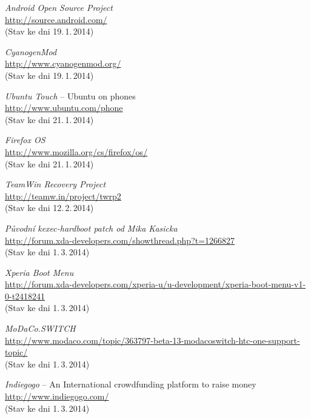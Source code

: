 \documentclass[12pt, a4paper, oneside]{article}
\newcommand{\It}{\textit}  %
\begin{document}
 \begin{thebibliography}{99}

     \It{Android Open Source Project} \\
    \url{http://source.android.com/}\\
    (Stav ke dni 19.\,1.\,2014)

     \It{CyanogenMod} \\
    \url{http://www.cyanogenmod.org/}\\
    (Stav ke dni 19.\,1.\,2014)

     \It{Ubuntu Touch} -- Ubuntu on phones \\
    \url{http://www.ubuntu.com/phone}\\
    (Stav ke dni 21.\,1.\,2014)

     \It{Firefox OS}\\
    \url{http://www.mozilla.org/cs/firefox/os/}\\
    (Stav ke dni 21.\,1.\,2014)

     \It{TeamWin Recovery Project}\\
    \url{http://teamw.in/project/twrp2}\\
    (Stav ke dni 12.\,2.\,2014)

     \It{Původní kexec-hardboot patch od Mika Kasicka}\\
    \url{http://forum.xda-developers.com/showthread.php?t=1266827}\\
    (Stav ke dni 1.\,3.\,2014)

     \It{Xperia Boot Menu}\\
    \url{http://forum.xda-developers.com/xperia-u/u-development/xperia-boot-menu-v1-0-t2418241}\\
    (Stav ke dni 1.\,3.\,2014)

     \It{MoDaCo.SWITCH}\\
    \url{http://www.modaco.com/topic/363797-beta-13-modacoswitch-htc-one-support-topic/}\\
    (Stav ke dni 1.\,3.\,2014)

     \It{Indiegogo} -- An International crowdfunding platform to raise money\\
    \url{http://www.indiegogo.com/}\\
    (Stav ke dni 1.\,3.\,2014)


\end{thebibliography}
\end{document}
